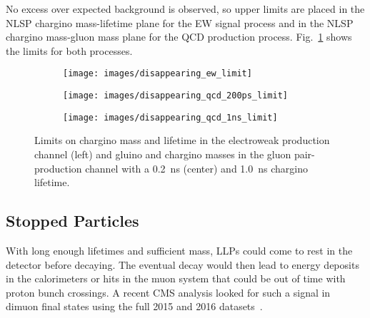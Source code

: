 \documentclass[12pt]{article}
\begin{document}
        No excess over expected background is observed, so upper limits are placed in the NLSP chargino mass-lifetime plane for the EW signal process and in the NLSP chargino mass-gluon mass plane for the QCD production process. Fig.~\ref{disappearing_limits} shows the limits for both processes.

        \noindent \begin{figure}[htbp] \begin{center}
        \begin{subfigure}[htbp]{0.3\textwidth} \begin{center}
        \texttt{[image: images/disappearing\_ew\_limit]}
        \end{center} \end{subfigure}
        \begin{subfigure}[htbp]{0.3\textwidth} \begin{center}
        \texttt{[image: images/disappearing\_qcd\_200ps\_limit]}
        \end{center} \end{subfigure}
        \begin{subfigure}[htbp]{0.3\textwidth} \begin{center}
        \texttt{[image: images/disappearing\_qcd\_1ns\_limit]}
        \end{center} \end{subfigure}
            \caption{Limits on chargino mass and lifetime in the electroweak production channel (left) and gluino and chargino masses in the gluon pair-production channel with a \SI{0.2}{\nano\s} (center) and \SI{1.0}{\nano\s} chargino lifetime.~\cite{atlas_disappearing}}
        \label{disappearing_limits}
        \end{center} \end{figure}

    \subsection{Stopped Particles}
        With long enough lifetimes and sufficient mass, LLPs could come to rest in the detector before decaying. The eventual decay would then lead to energy deposits in the calorimeters or hits in the muon system that could be out of time with proton bunch crossings. A recent CMS analysis looked for such a signal in dimuon final states using the full 2015 and 2016 datasets~\cite{cms_stopped}. 
\end{document}
